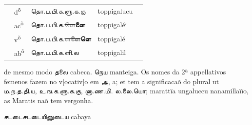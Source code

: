 \documentclass[12pt,a4paper]{scrbook}
\begin{document}
\begin{tabular}{lllll}
        
    
        
           &
          d\textsuperscript{õ} &
          தொ.ப.பி.க.ளு.க.கு &
          toppigalucu &
           \\
    
        
    
        
           &
          ac\textsuperscript{õ} &
          தொ.ப.பி.க.\sout{\textcolor{gray}{ளெ}}\textbf{ளை} &
          toppigaléi &
           \\
    
        
    
        
           &
          v\textsuperscript{õ} &
          தொ.ப.பி.க.\sout{\textcolor{gray}{ள}}\sout{\textcolor{gray}{\textbf{ளை}}}\textbf{ளெ} &
          toppigalé &
           \\
    
        
    
        
           &
          ab\textsuperscript{õ} &
          தொ.ப.பி.க.ளி.ல &
          toppigalil &
           \\
    
        
    
      
\end{tabular}
    
      

de mesmo modo தலை cabeca. நெய manteiga. Os nomes 
            da 2ª appellativos femenos fazem no v[ocativ]o em அ, a; et tem
            a significacaõ do plural ut ம.ற.த.தி.ய, உ.ங.க.ளு.க.கு, னா.ண.மி.
            ல.லை.யொ; marattïa ungaluccu nanamillaïïo, as Maratis naõ tem vergonha.
        
      

சடடைசடடையினுடைய cabaya
        
\end{document}
